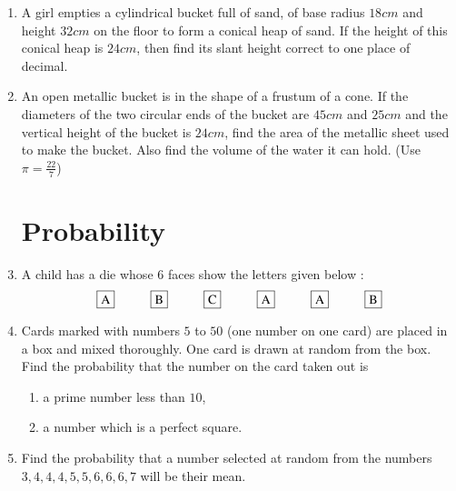 \documentclass[2pt,-letter paper]{article}
\begin{document}
\begin{enumerate}
\begin{figure}[H]
    \label{fig:Fig-3}
\end{figure}

\item A girl empties a cylindrical bucket full of sand, of base radius $18 cm$ and height $32 cm$ on the floor to form a conical heap of sand. If the height of this conical heap is $24 cm$, then find its slant height correct to one place of decimal.

\item An open metallic bucket is in the shape of a frustum of a cone. If the diameters of the two circular ends of the bucket are $45 cm$ and $25 cm$ and the vertical height of the bucket is $24 cm$, find the area of the metallic sheet used to make the bucket. Also find the volume of the water it can 
hold. (Use $\pi =\frac{22}{7}$)

\section{Probability}

\item A child has a die whose $6$ faces show the letters given below :
\begin{align*}
    { \framebox {A} \hspace{1cm}} {\framebox {B} \hspace{1cm}} {\framebox {C}\hspace{1cm}} {\framebox {A}\hspace{1cm}} {\framebox {A}\hspace{1cm}} {\framebox {B}}
\end{align*}

\item Cards marked with numbers $5$ to $50$ (one number on one card) are placed in a box and mixed thoroughly. One card is drawn at random from the box. Find the probability that the number on the card taken out is \begin{enumerate}
    \item a prime number less than $10$,  
    \item a number which is a perfect square.
\end{enumerate}

\item Find the probability that a number selected at random from the numbers $3, 4, 4, 4, 5, 5, 6, 6, 6, 7$ will be their mean.


\end{enumerate}
\end{document}
